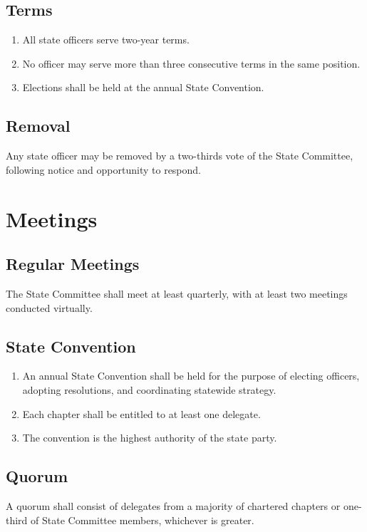 \documentclass[11pt, letterpaper]{article}
\begin{document}
\subsection{Terms}
\begin{enumerate}
  \item All state officers serve two-year terms.
  \item No officer may serve more than three consecutive terms in the same position.
  \item Elections shall be held at the annual State Convention.
\end{enumerate}

\subsection{Removal}
Any state officer may be removed by a two-thirds vote of the State Committee, following notice and opportunity to respond.

\section{Meetings}

\subsection{Regular Meetings}
The State Committee shall meet at least quarterly, with at least two meetings conducted virtually.

\subsection{State Convention}
\begin{enumerate}
  \item An annual State Convention shall be held for the purpose of electing officers, adopting resolutions, and coordinating statewide strategy.
  \item Each chapter shall be entitled to at least one delegate.
  \item The convention is the highest authority of the state party.
\end{enumerate}

\subsection{Quorum}
A quorum shall consist of delegates from a majority of chartered chapters or one-third of State Committee members, whichever is greater.
\end{document}
